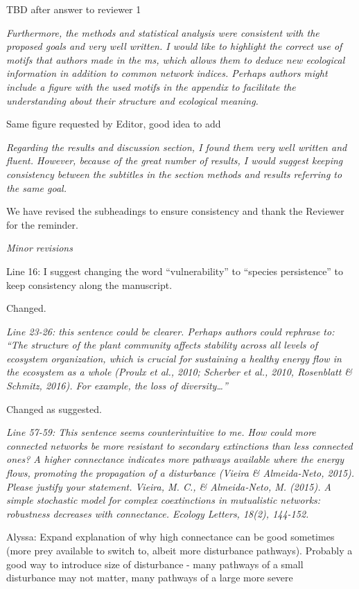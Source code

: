 \documentclass[12pt]{article}
\newcommand{\us}{\rm \setlength{\leftskip}{0.3cm} \setlength{\rightskip}{0.3cm}}
\newcommand{\them}{\it \setlength{\leftskip}{0cm} \setlength{\rightskip}{0cm}}
\begin{document}
\us TBD after answer to reviewer 1

\them
Furthermore, the methods and statistical analysis were consistent with the proposed goals and very well written. I would like to highlight the correct use of motifs that authors made in the ms, which allows them to deduce new ecological information in addition to common network indices. Perhaps authors might include a figure with the used motifs in the appendix to facilitate the understanding about their structure and ecological meaning. 

\us Same figure requested by Editor, good idea to add

\them
Regarding the results and discussion section, I found them very well written and fluent. However, because of the great number of results, I would suggest keeping consistency between the subtitles in the section methods and results referring to the same goal.

\us We have revised the subheadings to ensure consistency and thank the Reviewer for the reminder.

\them
Minor revisions

Line 16: I suggest changing the word “vulnerability” to “species persistence” to keep consistency along the manuscript.

\us
Changed.

\them
Line 23-26: this sentence could be clearer. Perhaps authors could rephrase to: “The structure of the plant community affects stability across all levels of ecosystem organization, which is crucial for sustaining a healthy energy flow in the ecosystem as a whole (Proulx et al., 2010; Scherber et al., 2010, Rosenblatt & Schmitz, 2016). For example, the loss of diversity…”

\us Changed as suggested.

\them
Line 57-59: This sentence seems counterintuitive to me. How could more connected networks be more resistant to secondary extinctions than less connected ones? A higher connectance indicates more pathways available where the energy flows, promoting the propagation of a disturbance (Vieira \& Almeida-Neto, 2015). Please justify your statement.
Vieira, M. C., \& Almeida‐Neto, M. (2015). A simple stochastic model for complex coextinctions in mutualistic networks: robustness decreases with connectance. Ecology Letters, 18(2), 144-152.

\us Alyssa: Expand explanation of why high connectance can be good sometimes (more prey available to switch to, albeit more disturbance pathways). Probably a good way to introduce size of disturbance - many pathways of a small disturbance may not matter, many pathways of a large more severe
\end{document}
